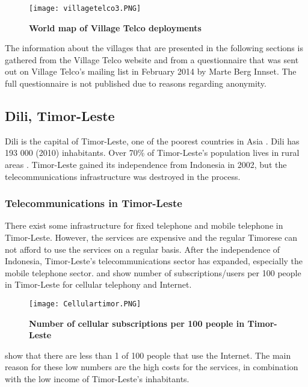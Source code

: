 \begin{figure}[H]
\centering
\texttt{[image: villagetelco3.PNG]}
\caption [World map of Village Telco deployments]{\textbf{World map of Village Telco deployments}}
\label{fig:mapdeployments}
\end{figure}

The information about the villages that are presented in the following sections is gathered from the Village Telco website \cite{villagetelcodeployments} and from a questionnaire that was sent out on Village Telco's mailing list in February 2014 by Marte Berg Innset. The full questionnaire is not published due to reasons regarding anonymity. 

\subsection{Dili, Timor-Leste}\label{sec:timor}
Dili is the capital of Timor-Leste, one of the poorest countries in Asia \cite{vtdili}. Dili has 193 000 (2010) inhabitants. Over 70\% of Timor-Leste's population lives in rural areas \cite{quandltimor}.  Timor-Leste gained its independence from Indonesia in 2002, but the telecommunications infrastructure was destroyed in the process. 


\subsubsection{Telecommunications in Timor-Leste}
There exist some infrastructure for fixed telephone and mobile telephone in Timor-Leste. However, the services are expensive and the regular Timorese can not afford to use the services on a regular basis. After the independence of Indonesia, Timor-Leste's telecommunications sector has expanded, especially the mobile telephone sector.  and  show number of subscriptions/users per 100 people in Timor-Leste for cellular telephony and Internet. 

\begin{figure}[H]
\centering
\texttt{[image: Cellulartimor.PNG]}
\caption[Number of cellular subscriptions per 100 people in Timor-Leste]{\textbf{Number of cellular subscriptions per 100 people in Timor-Leste}}
\label{fig:cellulartimor}
\end{figure}

 show that there are less than 1 of 100 people that use the Internet. The main reason for these low numbers are the high costs for the services, in combination with the low income of Timor-Leste's inhabitants. 


